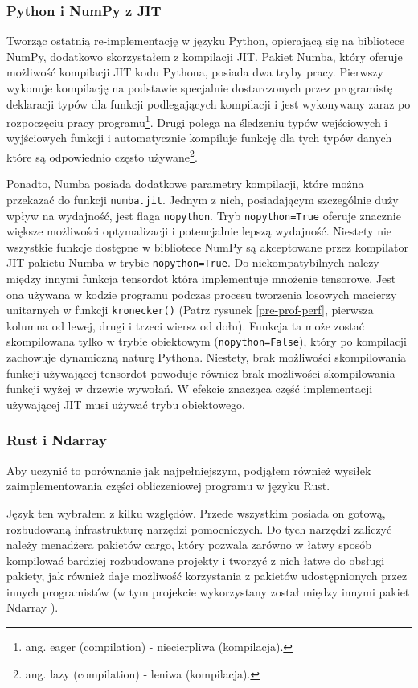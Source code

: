 \documentclass[11pt, a4paper]{article}
\newcommand{\code}[1]{\texttt{#1}}
\begin{document}
\begin{sloppypar}
    \subsubsection{Python i NumPy z JIT}
    Tworząc ostatnią re-implementację w języku Python, opierającą się na bibliotece NumPy,
    dodatkowo skorzystałem z kompilacji JIT. Pakiet Numba, który oferuje możliwość
    kompilacji JIT kodu Pythona, posiada dwa tryby pracy. Pierwszy wykonuje kompilację
    na podstawie specjalnie dostarczonych przez programistę deklaracji typów dla funkcji
    podlegających kompilacji i jest wykonywany zaraz po rozpoczęciu pracy programu\footnote{ang.
    eager (compilation) - niecierpliwa (kompilacja).}. Drugi polega na śledzeniu typów wejściowych
    i wyjściowych funkcji i automatycznie kompiluje funkcję dla tych typów danych które są
    odpowiednio często używane\footnote{ang. lazy (compilation) - leniwa (kompilacja).}.

    Ponadto, Numba posiada dodatkowe parametry kompilacji, które można przekazać do funkcji
    \code{numba.jit}. Jednym z nich, posiadającym szczególnie duży wpływ na wydajność, jest
    flaga \code{nopython}. Tryb \code{nopython=True} oferuje znacznie większe możliwości
    optymalizacji i potencjalnie lepszą wydajność. Niestety nie wszystkie funkcje dostępne
    w bibliotece NumPy są akceptowane przez kompilator JIT pakietu Numba w trybie \code{nopython=True}.
    Do niekompatybilnych należy między innymi funkcja tensordot która implementuje mnożenie
    tensorowe. Jest ona używana w kodzie programu podczas procesu tworzenia losowych
    macierzy unitarnych w funkcji \code{kronecker()} (Patrz rysunek \ref{pre-prof-perf},
    pierwsza kolumna od lewej, drugi i trzeci wiersz od dołu). Funkcja ta może zostać
    skompilowana tylko w trybie obiektowym (\code{nopython=False}), który po kompilacji
    zachowuje dynamiczną naturę Pythona. Niestety, brak możliwości skompilowania funkcji
    używającej tensordot powoduje również brak możliwości skompilowania funkcji wyżej w
    drzewie wywołań. W efekcie znacząca część implementacji używającej JIT musi używać trybu
    obiektowego.

    \subsubsection{Rust i Ndarray}
    Aby uczynić to porównanie jak najpełniejszym, podjąłem również wysiłek
    zaimplementowania części obliczeniowej programu w języku Rust.

    Język ten wybrałem z kilku względów. Przede wszystkim posiada on gotową, rozbudowaną
    infrastrukturę narzędzi pomocniczych. Do tych narzędzi zaliczyć należy menadżera pakietów
    cargo, który pozwala zarówno w łatwy sposób kompilować bardziej rozbudowane projekty
    i tworzyć z nich łatwe do obsługi pakiety, jak również daje możliwość korzystania z pakietów
    udostępnionych przez innych programistów (w tym projekcie wykorzystany został między
    innymi pakiet Ndarray \cite{Ndarray}).


\end{sloppypar}
\end{document}
